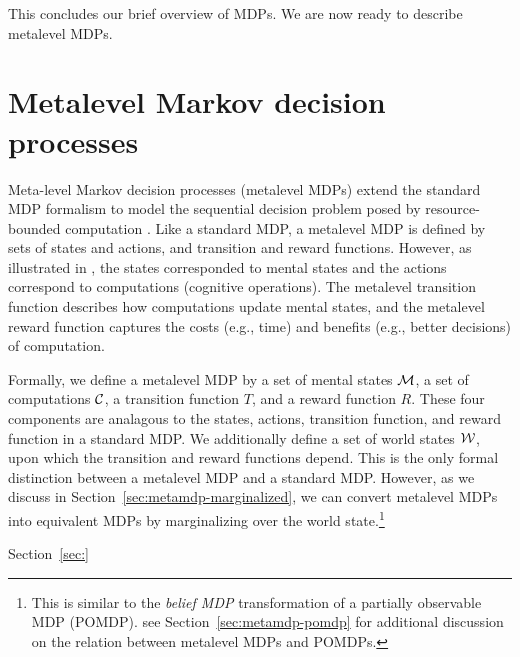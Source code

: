 This concludes our brief overview of MDPs. We are now ready to describe metalevel MDPs.


\section{Metalevel Markov decision processes}


Meta-level Markov decision processes (metalevel MDPs) extend the standard MDP formalism to model the sequential decision problem posed by resource-bounded computation \citep{hay2012selecting}. Like a standard MDP, a metalevel MDP is defined by sets of states and actions, and transition and reward functions. However, as illustrated in , the states corresponded to mental states and the actions correspond to computations (cognitive operations). The metalevel transition function describes how computations update mental states, and the metalevel reward function captures the costs (e.g., time) and benefits (e.g., better decisions) of computation.

Formally, we define a metalevel MDP by a set of mental states $\mathcal{M}$, a set of computations $\mathcal{C}$, a transition function $T$, and a reward function $R$. These four components are analagous to the states, actions, transition function, and reward function in a standard MDP. We additionally define a set of world states $\mathcal{W}$, upon which the transition and reward functions depend. This is the only formal distinction between a metalevel MDP and a standard MDP. However, as we discuss in Section~\ref{sec:metamdp-marginalized}, we can convert metalevel MDPs into equivalent MDPs by marginalizing over the world state.\footnote{This is similar to the \emph{belief MDP} transformation of a partially observable MDP (POMDP). see Section~\ref{sec:metamdp-pomdp} for additional discussion on the relation between metalevel MDPs and POMDPs.}

Section~\ref{sec:}



